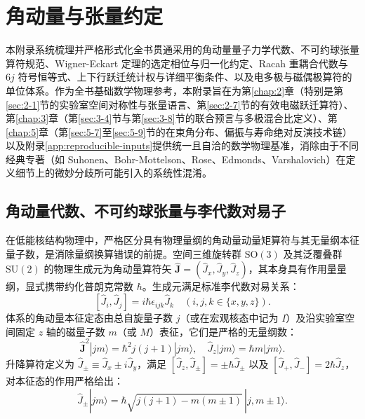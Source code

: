 \chapter{角动量与张量约定}\label{app:angular-momentum-tensors}

本附录系统梳理并严格形式化全书贯通采用的角动量量子力学代数、不可约球张量算符规范、Wigner-Eckart 定理的选定相位与归一化约定、Racah 重耦合代数与 $6j$ 符号恒等式、上下行跃迁统计权与详细平衡条件、以及电多极与磁偶极算符的单位体系。作为全书基础数学物理参考，本附录旨在为第\ref{chap:2}章（特别是第\ref{sec:2-1}节的实验室空间对称性与张量语言、第\ref{sec:2-7}节的有效电磁跃迁算符）、第\ref{chap:3}章（第\ref{sec:3-4}节与第\ref{sec:3-8}节的联合预言与多极混合比定义）、第\ref{chap:5}章（第\ref{sec:5-7}至\ref{sec:5-9}节的在束角分布、偏振与寿命绝对反演技术链）以及附录\ref{app:reproducible-inputs}提供统一且自洽的数学物理基准，消除由于不同经典专著（如 Suhonen、Bohr-Mottelson、Rose、Edmonds、Varshalovich）在定义细节上的微妙分歧所可能引入的系统性混淆。\cite{book-suhonen-from-nucleons-to-nucleus,book-bohr-mottelson-nuclear-structure-vol2,lange-kumar-hamilton-1982-multipole-admixtures}

\section{角动量代数、不可约球张量与李代数对易子}\label{sec:appA-1}

在低能核结构物理中，严格区分具有物理量纲的角动量动量矩算符与其无量纲本征量子数，是消除量纲换算错误的前提。空间三维旋转群 $\mathrm{SO}(3)$ 及其泛覆叠群 $\mathrm{SU}(2)$ 的物理生成元为角动量算符矢 $\hat{\mathbf{J}} = (\hat{J}_x, \hat{J}_y, \hat{J}_z)$，其本身具有作用量量纲，显式携带约化普朗克常数 $\hbar$。生成元满足标准李代数对易关系：
\begin{equation}\label{eq:appA-lie-comm}
[\hat{J}_i, \hat{J}_j] = i \hbar \epsilon_{ijk} \hat{J}_k \quad (i, j, k \in \{x, y, z\}) .
\end{equation}
体系的角动量本征定态由总自旋量子数 $j$（或在宏观核态中记为 $I$）及沿实验室空间固定 $z$ 轴的磁量子数 $m$（或 $M$）表征，它们是严格的无量纲数：
\begin{equation}\label{eq:appA-j-eigen}
\hat{\mathbf{J}}^2 |j m\rangle = \hbar^2 j(j+1) |j m\rangle , \quad \hat{J}_z |j m\rangle = \hbar m |j m\rangle .
\end{equation}
升降算符定义为 $\hat{J}_\pm \equiv \hat{J}_x \pm i \hat{J}_y$，满足 $[\hat{J}_z, \hat{J}_\pm] = \pm \hbar \hat{J}_\pm$ 以及 $[\hat{J}_+, \hat{J}_-] = 2\hbar \hat{J}_z$，对本征态的作用严格给出：
\begin{equation}\label{eq:appA-ladder-action}
\hat{J}_\pm |j m\rangle = \hbar \sqrt{j(j+1) - m(m \pm 1)} \, |j, m \pm 1\rangle .
\end{equation}

